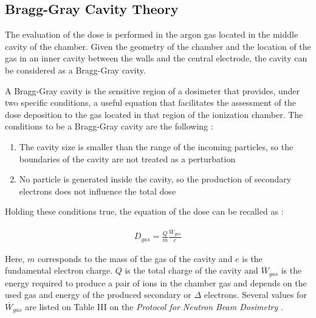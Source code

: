 \subsection{Bragg-Gray Cavity Theory}

The evaluation of the dose is performed in the argon gas located in the middle cavity of the chamber. Given the geometry of the chamber and the location of the gas in an inner cavity between the walls and the central electrode, the cavity can be considered as a Bragg-Gray cavity.

A Bragg-Gray cavity is the sensitive region of a dosimeter that provides, under two specific conditions, a useful equation that facilitates the assessment of the dose deposition to the gas located in that region of the ionization chamber. The conditions to be a Bragg-Gray cavity are the following \cite{RadiationOncologyInPhysicsHandbook}:

\begin{enumerate}
  \item The cavity size is smaller than the range of the incoming particles, so the boundaries of the cavity are not treated as a perturbation
  \item No particle is generated inside the cavity, so the production of secondary electrons does not influence the total dose
\end{enumerate}

Holding these conditions true, the equation of the dose can be recalled as \cite{gray1936ionization}:


\begin{align}
\label{eq:DoseToCavityGasBragg-Gray}
    {D_{gas} = \frac{Q}{m} \frac{\overline W_{gas}}{e}}
\end{align}

Here, $m$ corresponds to the mass of the gas of the cavity and $e$ is the fundamental electron charge. $Q$ is the total charge of the cavity and $\overline W_{gas}$ is the energy required to produce a pair of ions in the chamber gas and depends on the used gas and energy of the produced secondary or $\Delta$ electrons. Several values for $\overline W_{gas}$ are listed on Table III on the \textit{Protocol for Neutron Beam Dosimetry} \cite{aapm1980protocol}. 

